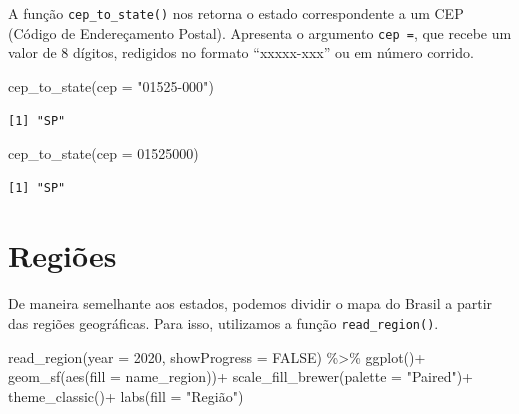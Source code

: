 \documentclass[
  brazilian,
]{book}
\newenvironment{Shaded}{\begin{snugshade}}{\end{snugshade}}
\newcommand{\AttributeTok}[1]{\textcolor[rgb]{0.77,0.63,0.00}{#1}}
\newcommand{\ConstantTok}[1]{\textcolor[rgb]{0.00,0.00,0.00}{#1}}
\newcommand{\DecValTok}[1]{\textcolor[rgb]{0.00,0.00,0.81}{#1}}
\newcommand{\FunctionTok}[1]{\textcolor[rgb]{0.00,0.00,0.00}{#1}}
\newcommand{\NormalTok}[1]{#1}
\newcommand{\SpecialCharTok}[1]{\textcolor[rgb]{0.00,0.00,0.00}{#1}}
\newcommand{\StringTok}[1]{\textcolor[rgb]{0.31,0.60,0.02}{#1}}
\begin{document}
A função \texttt{cep\_to\_state()} nos retorna o estado correspondente a um CEP (Código de Endereçamento Postal). Apresenta o argumento \texttt{cep\ =}, que recebe um valor de 8 dígitos, redigidos no formato ``xxxxx-xxx'' ou em número corrido.

\begin{Shaded}
\begin{Highlighting}[]
\FunctionTok{cep\_to\_state}\NormalTok{(}\AttributeTok{cep =} \StringTok{"01525{-}000"}\NormalTok{)}
\end{Highlighting}
\end{Shaded}

\begin{verbatim}
[1] "SP"
\end{verbatim}

\begin{Shaded}
\begin{Highlighting}[]
\FunctionTok{cep\_to\_state}\NormalTok{(}\AttributeTok{cep =} \DecValTok{01525000}\NormalTok{)}
\end{Highlighting}
\end{Shaded}

\begin{verbatim}
[1] "SP"
\end{verbatim}

\hypertarget{regiuxf5es}{%
\section{Regiões}\label{regiuxf5es}}

De maneira semelhante aos estados, podemos dividir o mapa do Brasil a partir das regiões geográficas. Para isso, utilizamos a função \texttt{read\_region()}.

\begin{Shaded}
\begin{Highlighting}[]
\FunctionTok{read\_region}\NormalTok{(}\AttributeTok{year =} \DecValTok{2020}\NormalTok{,}
            \AttributeTok{showProgress =} \ConstantTok{FALSE}\NormalTok{) }\SpecialCharTok{\%\textgreater{}\%} 
  \FunctionTok{ggplot}\NormalTok{()}\SpecialCharTok{+}
  \FunctionTok{geom\_sf}\NormalTok{(}\FunctionTok{aes}\NormalTok{(}\AttributeTok{fill =}\NormalTok{ name\_region))}\SpecialCharTok{+}
  \FunctionTok{scale\_fill\_brewer}\NormalTok{(}\AttributeTok{palette =} \StringTok{"Paired"}\NormalTok{)}\SpecialCharTok{+}
  \FunctionTok{theme\_classic}\NormalTok{()}\SpecialCharTok{+}
  \FunctionTok{labs}\NormalTok{(}\AttributeTok{fill =} \StringTok{"Região"}\NormalTok{)}
\end{Highlighting}
\end{Shaded}
\end{document}
